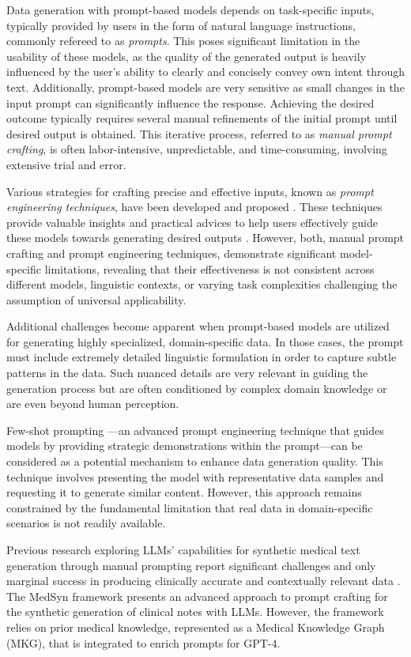 \documentclass[runningheads]{llncs}
\begin{document}
Data generation with prompt-based models depends on task-specific inputs, typically provided by users in the form of natural language instructions, commonly refereed to as \textit{prompts}. This poses significant limitation in the usability of these models, as the quality of the generated output is heavily influenced by the user's ability to clearly and concisely convey own intent through text. Additionally, prompt-based models are very sensitive as small changes in the input prompt can significantly influence the response. Achieving the desired outcome typically requires several manual refinements of the initial prompt until desired output is obtained. This iterative process, referred to as \textit{manual prompt crafting}, is often labor-intensive, unpredictable, and time-consuming, involving extensive trial and error.

Various strategies for crafting precise and effective inputs, known as \textit{prompt engineering techniques}, have been developed and proposed \cite{amatriain2024}. These techniques provide valuable insights and practical advices to help users effectively guide these models towards generating desired outputs \cite{schulhoff2024}. However, both, manual prompt crafting and prompt engineering techniques, demonstrate significant model-specific limitations, revealing that their effectiveness is not consistent across different models, linguistic contexts, or varying task complexities \cite{liu2024,kepel2024} challenging the assumption of universal applicability. 

Additional challenges become apparent when prompt-based models are utilized for generating highly specialized, domain-specific data. In those cases, the prompt must include extremely detailed linguistic formulation in order to capture subtle patterns in the data. Such nuanced details are very relevant in guiding the generation process but are often conditioned by complex domain knowledge or are even beyond human perception. 

Few-shot prompting \cite{FewShotLearners}—an advanced prompt engineering technique that guides models by providing strategic demonstrations within the prompt—can be considered as a potential mechanism to enhance data generation quality. This technique involves presenting the model with representative data samples and requesting it to generate similar content. However, this approach remains constrained by the fundamental limitation that real data in domain-specific scenarios is not readily available.

Previous research exploring LLMs' capabilities for synthetic medical text generation through manual prompting report significant challenges and only marginal success in producing clinically accurate and contextually relevant data \cite{uyguner2023chatgpt,Sufi2024}. The MedSyn framework \cite{Kumichev2024} presents an advanced approach to prompt crafting for the synthetic generation of clinical notes with LLMs. However, the framework relies on prior medical knowledge, represented as a Medical Knowledge Graph (MKG), that is integrated to enrich prompts for GPT-4.
\end{document}
